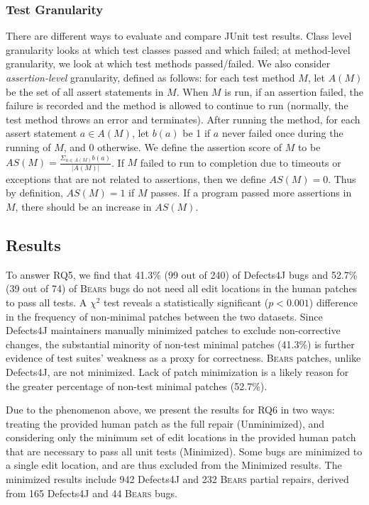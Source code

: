 \documentclass[10pt, conference]{IEEEtran}
\newcommand\bears{\textsc{Bears}\xspace}
\begin{document}
\subsubsection{Test Granularity}

There are different ways to evaluate and compare JUnit test results. Class level granularity
looks at which test classes passed and which failed; at method-level
granularity, we look at which test methods passed/failed.
We also consider \emph{assertion-level} granularity, defined as follows:
for each test method $M$, let $A(M)$ be the set of all assert statements in $M$. 
When $M$ is run, if an assertion failed, the failure is recorded and the method 
is allowed to continue to run (normally, the test method throws an 
error and terminates). After running the method, for each assert statement 
$a\in A(M)$, let $b(a)$ be 1 if $a$ never failed once during the running of $M$, 
and 0 otherwise. We define the assertion score of $M$ to be 
$AS(M)=\frac{\Sigma_{a\in A(M)}b(a)}{|A(M)|}$. If $M$ failed to run to completion 
due to timeouts or exceptions that are not related to assertions, then we define 
$AS(M)=0$. Thus by definition, $AS(M)=1$ if $M$ passes. If a program passed more 
assertions in $M$, there should be an increase in $AS(M)$.


\subsection{Results}

To answer RQ5, we find that 41.3\%  (99 out of 240) of Defects4J bugs and 52.7\% (39 out of 74) of
\bears bugs do not need all edit locations in the human patches
to pass all tests.
A $\chi^2$ test reveals a statistically significant ($p < 0.001$) difference in the frequency
of non-minimal patches between the two datasets.
Since Defects4J maintainers manually minimized patches to exclude
non-corrective changes, the substantial minority of non-test minimal patches
(41.3\%) is further evidence of test suites' weakness as a proxy for correctness.
\bears patches, unlike Defects4J, are not minimized. Lack of patch minimization
is a likely reason for the greater percentage of non-test minimal patches (52.7\%).

Due to the phenomenon above, we present the results for RQ6 in two ways:
treating the provided human patch as the full repair
(Unminimized), and considering only the minimum set of edit locations in the
provided human patch that are necessary
to pass all unit tests (Minimized).
Some bugs are minimized to a single edit location, and are thus excluded
from the Minimized results. The minimized results
include 942 Defects4J and 232 \bears partial repairs, derived from
165 Defects4J and 44 \bears bugs.
\end{document}
